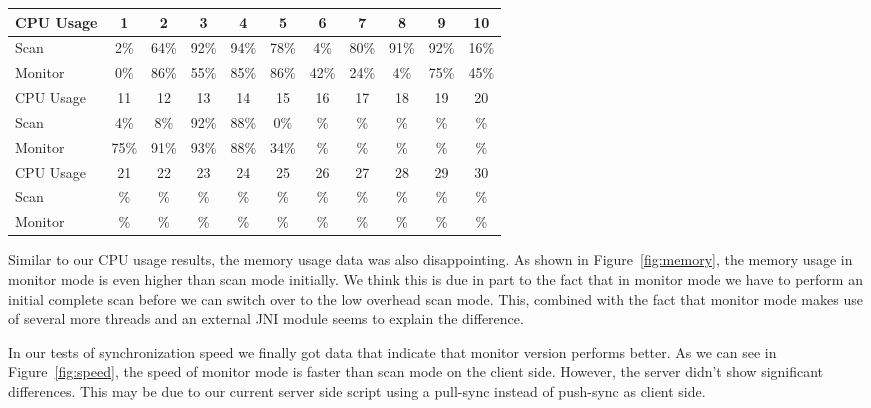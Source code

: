 \onecolumn
\begin{center}
  \begin{tabular}{ | l || c | c | c | c | c | c | c | c | c | c | }
    \hline
CPU Usage& 1  & 2	 & 3 	& 4 	& 5 	& 6 	& 7 	& 8 	& 9 	& 10	 	\\ \hline\hline
Scan	& 2\% & 64\% & 92\%	& 94\% 	& 78\% 	& 4\%	& 80\%	& 91\%	& 92\%	& 16\% 	  	\\ \hline
Monitor	& 0\% & 86\% & 55\%	& 85\% 	& 86\% 	& 42\%	& 24\%	& 4\%	& 75\%	& 45\% 		\\ \hline\hline

CPU Usage& 11 & 12	 & 13	& 14	& 15	& 16 	& 17 	& 18 	& 19 	& 20 		\\ \hline\hline
Scan	& 4\% & 8\%	 & 92\%	& 88\% 	& 0\% 	& \%	& \%	& \%	& \%	& \%  		\\ \hline
Monitor	&75\% & 91\% & 93\%	& 88\%	& 34\% 	& \%	& \%	& \%	& \%	& \%  		\\ \hline\hline

CPU Usage& 21 & 22	 & 23	& 24	& 25	& 26 	& 27 	& 28 	& 29 	& 30 		\\ \hline\hline
Scan	& \% & \%	 & \%	& \% 	& \% 	& \%	& \%	& \%	& \%	& \%  		\\ \hline
Monitor	& \% & \% 	 & \%	& \%	& \% 	& \%	& \%	& \%	& \%	& \%  		\\ \hline\hline
  \end{tabular}
\end{center}
\twocolumn


\onecolumn

\twocolumn
Similar to our CPU usage results, the memory usage data was also disappointing. As shown in Figure~\ref{fig:memory}, the memory usage in monitor mode is even higher than scan mode initially. We think this is due in part to the fact that in monitor mode we have to perform an initial complete scan before we can switch over to the low overhead scan mode.  This, combined with the fact that monitor mode makes use of several more threads and an external JNI module seems to explain the difference.

\onecolumn

\twocolumn
In our tests of synchronization speed we finally got data that indicate that monitor version performs better. 
As we can see in Figure~\ref{fig:speed}, the speed of monitor mode is faster than scan mode on the client side. However,
the server didn't show significant differences. This may be due to our current server side script using a pull-sync instead of push-sync as client side.

